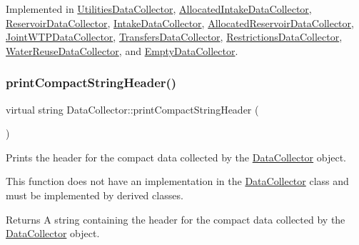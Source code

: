 Implemented in \mbox{\hyperlink{classUtilitiesDataCollector_a57b5f9cd8ddf54154476749ab0977355}{Utilities\+Data\+Collector}}, \mbox{\hyperlink{classAllocatedIntakeDataCollector_aeadb39cfe7fc84264e3bb83ed26b0621}{Allocated\+Intake\+Data\+Collector}}, \mbox{\hyperlink{classReservoirDataCollector_a0b68d7fa4a6d704350340d1ac3e8a1d2}{Reservoir\+Data\+Collector}}, \mbox{\hyperlink{classIntakeDataCollector_ac39a40726fd4fe887425b24a10f04034}{Intake\+Data\+Collector}}, \mbox{\hyperlink{classAllocatedReservoirDataCollector_a35f8125d428e65c737ff3360ae9bd0cd}{Allocated\+Reservoir\+Data\+Collector}}, \mbox{\hyperlink{classJointWTPDataCollector_aadb9fb969b265c72555bb5a7d3ed945d}{Joint\+W\+T\+P\+Data\+Collector}}, \mbox{\hyperlink{classTransfersDataCollector_aa5385877143c67a4d300032160239cfe}{Transfers\+Data\+Collector}}, \mbox{\hyperlink{classRestrictionsDataCollector_ab8b8c30dca6b2e41c1ef5e3ac7e29813}{Restrictions\+Data\+Collector}}, \mbox{\hyperlink{classWaterReuseDataCollector_a6b37aa4b2031cf0a1a1326da2bd64420}{Water\+Reuse\+Data\+Collector}}, and \mbox{\hyperlink{classEmptyDataCollector_ad4a4ebbf610b3939e34442795a392dd5}{Empty\+Data\+Collector}}.

\mbox{\label{classDataCollector_a98dcb4ec871d9c7fbf7545c64e5ccc67}} 
\subsubsection{\texorpdfstring{print\+Compact\+String\+Header()}{printCompactStringHeader()}}
{\footnotesize\ttfamily virtual string Data\+Collector\+::print\+Compact\+String\+Header (\begin{DoxyParamCaption}{ }\end{DoxyParamCaption})\hspace{0.3cm}{\ttfamily [pure virtual]}}



Prints the header for the compact data collected by the \mbox{\hyperlink{classDataCollector}{Data\+Collector}} object. 

This function does not have an implementation in the \mbox{\hyperlink{classDataCollector}{Data\+Collector}} class and must be implemented by derived classes.

\begin{DoxyReturn}{Returns}
A string containing the header for the compact data collected by the \mbox{\hyperlink{classDataCollector}{Data\+Collector}} object. 
\end{DoxyReturn}


